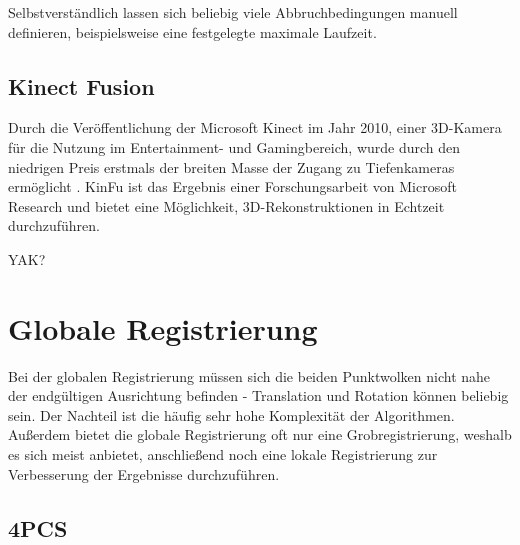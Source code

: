 Selbstverständlich lassen sich beliebig viele Abbruchbedingungen manuell definieren, beispielsweise eine festgelegte maximale Laufzeit.

\subsection{Kinect Fusion}
\label{subsec:kinfu}

Durch die Veröffentlichung der Microsoft Kinect im Jahr 2010, einer 3D-Kamera für die Nutzung im Entertainment- und Gamingbereich, wurde durch den niedrigen Preis erstmals der breiten Masse der Zugang zu Tiefenkameras ermöglicht \cite[1:55]{kinfuTalkYoutube}.
\ac{KinFu} ist das Ergebnis einer Forschungsarbeit von Microsoft Research \cite{izadi2011kinectfusion} und bietet eine Möglichkeit, 3D-Rekonstruktionen in Echtzeit durchzuführen.

YAK? \cite{klingensmith2015chisel}


\section{Globale Registrierung}
\label{sec:global-registration}

Bei der globalen Registrierung müssen sich die beiden Punktwolken nicht nahe der endgültigen Ausrichtung befinden - Translation und Rotation können beliebig sein.
Der Nachteil ist die häufig sehr hohe Komplexität der Algorithmen.
Außerdem bietet die globale Registrierung oft nur eine Grobregistrierung, weshalb es sich meist anbietet, anschließend noch eine lokale Registrierung zur Verbesserung der Ergebnisse durchzuführen.


\subsection{\acl{4PCS}}
\label{subsec:4pcs}

